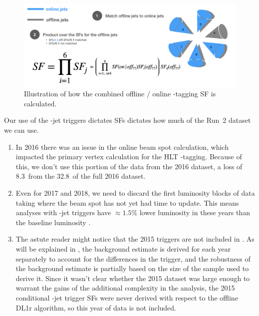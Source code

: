 \begin{figure}
\centering
\includegraphics[width=\textwidth]{figures/my_dihiggs/check-btag-jets-sf.png}
\caption{Illustration of how the combined offline / online \Pqb-tagging SF is calculated.}
\label{fig:ftag-online-sf}
\end{figure}

Our use of the \Pqb-jet triggers dictates SFs dictates how much of the Run~2 dataset we can use.
\begin{enumerate}
\item In 2016 there was an issue in the online beam spot calculation, which impacted the primary vertex calculation for the HLT \Pqb-tagging. Because of this, we don't use this portion of the data from the 2016 dataset, a loss of 8.3~\ifb from the 32.8~\ifb of the full 2016 dataset.
\item Even for 2017 and 2018, we need to discard the first luminosity blocks of data taking where the beam spot has not yet had time to update. This means analyses with \Pqb-jet triggers have $\approx 1.5$\% lower luminosity in these years than the baseline luminosity \cite{b-trig-paper}.
\item The astute reader might notice that the 2015 triggers are not included in \Tab{\ref{tab:nr-triggers}}. As will be explained in , the background estimate is derived for each year separately to account for the differences in the trigger, and the robustness of the background estimate is partially based on the size of the sample used to derive it. Since it wasn't clear whether the 2015 dataset was large enough to warrant the gains of the additional complexity in the analysis, the 2015 conditional \Pqb-jet trigger SFs were never derived with respect to the offline DL1r algorithm, so this year of data is not included.
\end{enumerate}


